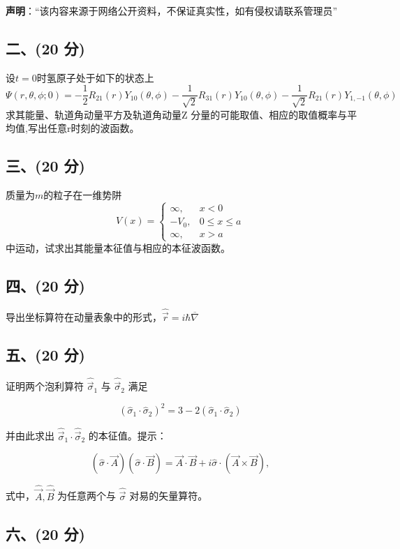 
\textbf{声明}：“该内容来源于网络公开资料，不保证真实性，如有侵权请联系管理员”

\subsection{二、(20 分)}
设$t=0$时氢原子处于如下的状态上
$$\Psi(r, \theta, \phi; 0) = -\frac{1}{2} R_{21}(r) Y_{10} (\theta, \phi) - \frac{1}{\sqrt{2}} R_{31}(r) Y_{10} (\theta, \phi) - \frac{1}{\sqrt{2}} R_{21}(r) Y_{1,-1} (\theta, \phi)~$$
求其能量、轨道角动量平方及轨道角动量Z 分量的可能取值、相应的取值概率与平均值,写出任意r时刻的波函数。
\subsection{三、(20 分)}
质量为$m$的粒子在一维势阱
\[
V(x) = \begin{cases} 
\infty, & x < 0 \\
-V_0, & 0 \leq x \leq a \\
\infty, & x > a
\end{cases}~
\] 
中运动，试求出其能量本征值与相应的本征波函数。
\subsection{四、(20 分)}
导出坐标算符在动量表象中的形式，$\hat{\vec{r}} = i\hbar\overline{\nabla}$
\subsection{五、(20 分)}
证明两个泡利算符 $\hat{\vec{\sigma}}_1$ 与 $\hat{\vec{\sigma}}_2$ 满足

$$(\hat{\sigma}_1 \cdot \hat{\sigma}_2)^2 = 3 - 2 (\hat{\sigma}_1 \cdot \hat{\sigma}_2)~$$

并由此求出 $\hat{\vec{\sigma}}_1 \cdot \hat{\vec{\sigma}}_2$ 的本征值。提示：

$$ \left( \hat{\sigma} \cdot \vec{A} \right) \left( \hat{\sigma} \cdot \vec{B} \right) = \vec{A} \cdot \vec{B} + i \hat{\sigma} \cdot (\vec{A} \times \vec{B}), ~$$

式中，$\hat{\vec{A}}, \hat{\vec{B}}$ 为任意两个与 $\hat{\vec{\sigma}}$ 对易的矢量算符。
\subsection{六、(20 分)}